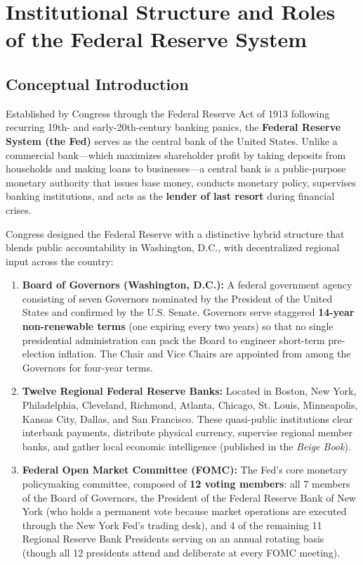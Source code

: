 \documentclass[11pt, oneside]{book}
\begin{document}
\section{Institutional Structure and Roles of the Federal Reserve System}

\subsection*{Conceptual Introduction}

Established by Congress through the Federal Reserve Act of 1913 following recurring 19th- and early-20th-century banking panics, the \textbf{Federal Reserve System (the Fed)} serves as the central bank of the United States. Unlike a commercial bank—which maximizes shareholder profit by taking deposits from households and making loans to businesses—a central bank is a public-purpose monetary authority that issues base money, conducts monetary policy, supervises banking institutions, and acts as the \textbf{lender of last resort} during financial crises.

Congress designed the Federal Reserve with a distinctive hybrid structure that blends public accountability in Washington, D.C., with decentralized regional input across the country:
\begin{enumerate}[leftmargin=1.5em, itemsep=3pt]
  \item \textbf{Board of Governors (Washington, D.C.):} A federal government agency consisting of seven Governors nominated by the President of the United States and confirmed by the U.S. Senate. Governors serve staggered \textbf{14-year non-renewable terms} (one expiring every two years) so that no single presidential administration can pack the Board to engineer short-term pre-election inflation. The Chair and Vice Chairs are appointed from among the Governors for four-year terms.
  \item \textbf{Twelve Regional Federal Reserve Banks:} Located in Boston, New York, Philadelphia, Cleveland, Richmond, Atlanta, Chicago, St. Louis, Minneapolis, Kansas City, Dallas, and San Francisco. These quasi-public institutions clear interbank payments, distribute physical currency, supervise regional member banks, and gather local economic intelligence (published in the \emph{Beige Book}).
  \item \textbf{Federal Open Market Committee (FOMC):} The Fed's core monetary policymaking committee, composed of \textbf{12 voting members}: all 7 members of the Board of Governors, the President of the Federal Reserve Bank of New York (who holds a permanent vote because market operations are executed through the New York Fed's trading desk), and 4 of the remaining 11 Regional Reserve Bank Presidents serving on an annual rotating basis (though all 12 presidents attend and deliberate at every FOMC meeting).
\end{enumerate}
\end{document}
